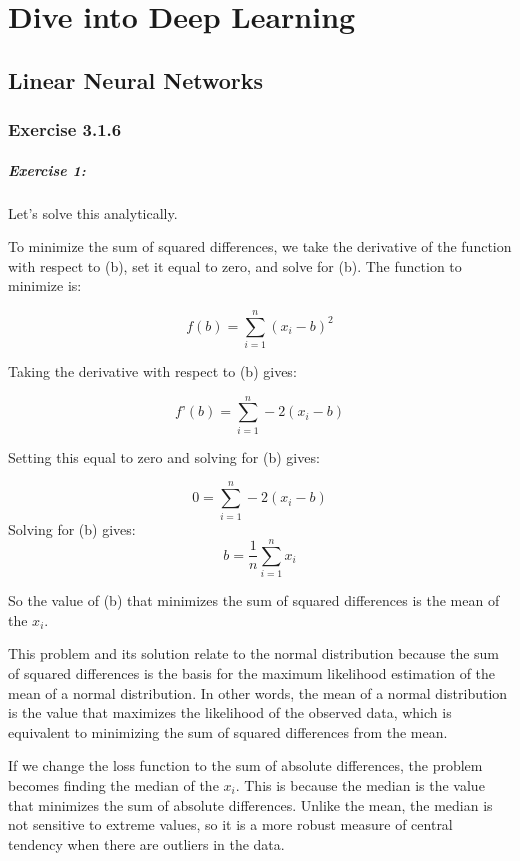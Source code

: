 \chapter{Dive into Deep Learning}\label{chp:dive-into-deep-learning}

\section{Linear Neural Networks} %
\label{sec:Linear Neural Networks}

\subsection{Exercise 3.1.6}

\paragraph{Exercise 1:}

Let’s solve this analytically.

To minimize the sum of squared differences, we take the derivative of the function with respect to (b), set it equal to zero, and solve for (b).
The function to minimize is:

\[
	f(b) = \sum_{i=1}^{n} (x_i - b)^2
\]

Taking the derivative with respect to (b) gives:

$$
	f’(b) = \sum_{i=1}^{n} -2(x_i - b)
$$

Setting this equal to zero and solving for (b) gives:

$$
	0 = \sum_{i=1}^{n} -2(x_i - b)
$$
Solving for (b) gives:
$$
	b = \frac{1}{n} \sum_{i=1}^{n} x_i
$$

So the value of (b) that minimizes the sum of squared differences is the mean of the \(x_i\).

This problem and its solution relate to the normal distribution because the sum of squared differences is the basis for the maximum likelihood estimation of the mean of a normal distribution.
In other words, the mean of a normal distribution is the value that maximizes the likelihood of the observed data, which is equivalent to minimizing the sum of squared differences from the mean.


If we change the loss function to the sum of absolute differences, the problem becomes finding the median of the \(x_i\).
This is because the median is the value that minimizes the sum of absolute differences.
Unlike the mean, the median is not sensitive to extreme values, so it is a more robust measure of central tendency when there are outliers in the data.

